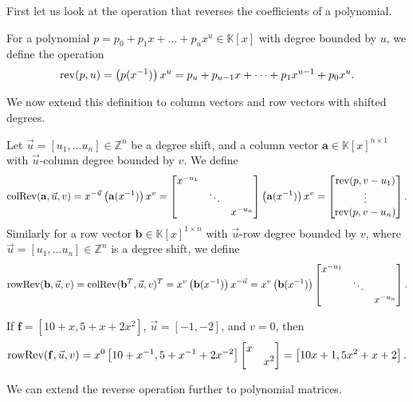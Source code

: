 First let us look at the operation that reverses the coefficients
of a polynomial.
\begin{defn}
For a polynomial $p=p_{0}+p_{1}x+\dots+p_{u}x^{u}\in\mathbb{K}\left[x\right]$
with degree bounded by $u$, we define the operation 
\[
\operatorname{rev}(p,u)=\left(p(x^{-1})\right)x^{u}=p_{u}+p_{u-1}x+\cdots+p_{1}x^{u-1}+p_{0}x^{u}.
\]

\end{defn}
We now extend this definition to column vectors and row vectors with
shifted degrees.
\begin{defn}
Let $\vec{u}=\left[u_{1},\dots u_{n}\right]\in\mathbb{Z}^{n}$ be
a degree shift, and a column vector $\mathbf{a}\in\mathbb{K}\left[x\right]^{n\times1}$
with $\vec{u}$-column degree bounded by $v$. We define
\[
\operatorname{colRev}(\mathbf{a},\vec{u},v)=x^{-\vec{u}}\left(\mathbf{a}(x^{-1})\right)x^{v}=\begin{bmatrix}x^{-u_{1}}\\
 & \ddots\\
 &  & x^{-u_{n}}
\end{bmatrix}\left(\mathbf{a}(x^{-1})\right)x^{v}=\begin{bmatrix}\operatorname{rev}(p,v-u_{1})\\
\vdots\\
\operatorname{rev}(p,v-u_{n})
\end{bmatrix}.
\]
Similarly for a row vector $\mathbf{b}\in\mathbb{K}\left[x\right]^{1\times n}$
with $\vec{u}$-row degree bounded by $v$, where $\vec{u}=\left[u_{1},\dots u_{n}\right]\in\mathbb{Z}^{n}$
is a degree shift, we define
\[
\operatorname{rowRev}(\mathbf{b},\vec{u},v)=\operatorname{colRev}(\mathbf{b}^{T},\vec{u},v)^{T}=x^{v}\left(\mathbf{b}(x^{-1})\right)x^{-\vec{u}}=x^{v}\left(\mathbf{b}(x^{-1})\right)\begin{bmatrix}x^{-u_{1}}\\
 & \ddots\\
 &  & x^{-u_{n}}
\end{bmatrix}.
\]
\end{defn}
\begin{example}
If $\mathbf{f}=\left[10+x,5+x+2x^{2}\right]$, $\vec{u}=\left[-1,-2\right]$,
and $v=0$, then 
\[
\operatorname{rowRev}(\mathbf{f},\vec{u},v)=x^{0}\left[10+x^{-1},5+x^{-1}+2x^{-2}\right]\begin{bmatrix}x\\
 & x^{2}
\end{bmatrix}=\left[10x+1,5x^{2}+x+2\right].
\]

\end{example}
We can extend the reverse operation further to polynomial matrices.
